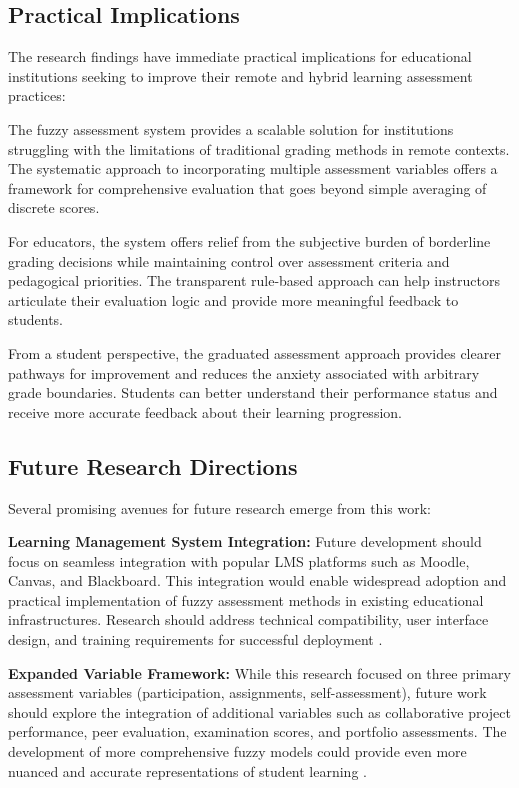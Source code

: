 \subsection{Practical Implications}

The research findings have immediate practical implications for educational institutions seeking to improve their remote and hybrid learning assessment practices:

The fuzzy assessment system provides a scalable solution for institutions struggling with the limitations of traditional grading methods in remote contexts. The systematic approach to incorporating multiple assessment variables offers a framework for comprehensive evaluation that goes beyond simple averaging of discrete scores.

For educators, the system offers relief from the subjective burden of borderline grading decisions while maintaining control over assessment criteria and pedagogical priorities. The transparent rule-based approach can help instructors articulate their evaluation logic and provide more meaningful feedback to students.

From a student perspective, the graduated assessment approach provides clearer pathways for improvement and reduces the anxiety associated with arbitrary grade boundaries. Students can better understand their performance status and receive more accurate feedback about their learning progression.

\subsection{Future Research Directions}

Several promising avenues for future research emerge from this work:

\textbf{Learning Management System Integration:} Future development should focus on seamless integration with popular LMS platforms such as Moodle, Canvas, and Blackboard. This integration would enable widespread adoption and practical implementation of fuzzy assessment methods in existing educational infrastructures. Research should address technical compatibility, user interface design, and training requirements for successful deployment \cite{Wilson2024}.

\textbf{Expanded Variable Framework:} While this research focused on three primary assessment variables (participation, assignments, self-assessment), future work should explore the integration of additional variables such as collaborative project performance, peer evaluation, examination scores, and portfolio assessments. The development of more comprehensive fuzzy models could provide even more nuanced and accurate representations of student learning \cite{Garcia2024}.

